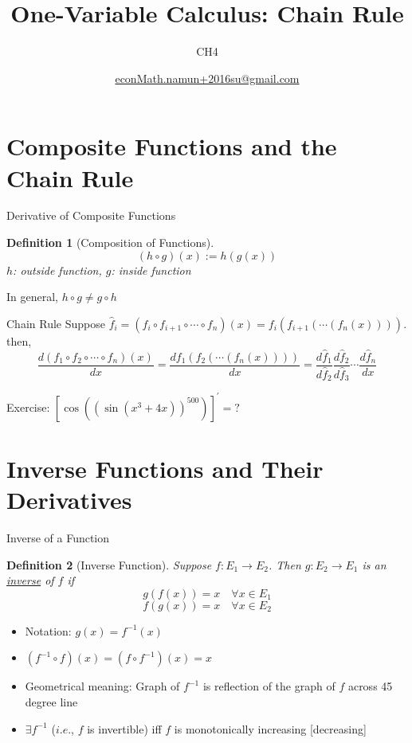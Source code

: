 \documentclass[a4paper,11pt]{article}
\author[조남운]{\url{econMath.namun+2016su@gmail.com}}
\title{One-Variable Calculus: Chain Rule}
\subtitle{CH4}
\newtheorem{defn}{Definition}
\begin{document}
	\maketitle


\section{Composite Functions and the Chain Rule} %
\label{sec:composite_functions_and_the_chain_rule}

\begin{frame}[t]{Derivative of Composite Functions}
	\begin{defn}
		[Composition of Functions]
		\[
			( h\circ g )(x) := h(g(x))
		\]
		$h$: outside function, $g$: inside function
	\end{defn}
	In general, $h\circ g \neq g \circ h$
	\begin{block}
		{Chain Rule}
		Suppose $\hat f_i = (f_i \circ f_{i+1} \circ \cdots \circ f_n)(x)=f_i(f_{i+1}(\cdots(f_n(x))))$. then,
		\[
			\frac{d( f_1 \circ f_2 \circ \cdots \circ f_n)(x)}{dx}=\frac{df_1(f_2(\cdots(f_n(x))))}{dx}= \frac{d\hat f_1}{d\hat f_2}\frac{d\hat f_2}{d\hat f_3}\cdots\frac{d\hat f_n}{dx}
		\]
	\end{block}
		Exercise: $[\cos((\sin(x^3+4x))^{500})]^\prime =?$
\end{frame}



\section{Inverse Functions and Their Derivatives} %
\label{sec:inverse_functions_and_their_derivatives}

\begin{frame}[t]{Inverse of a Function}
	\begin{defn}
		[Inverse Function]
		Suppose $f:E_1 \rightarrow E_2$. Then $g:E_2\rightarrow E_1$ is an \uline{inverse} of $f$ if\[
			g(f(x))=x\quad \forall x\in E_1
		\]\[
						f(g(x))=x\quad \forall x\in E_2
		\]
	\end{defn}
	\begin{itemize}
		\item Notation: $g(x)=f^{-1}(x)$
		\item $(f^{-1}\circ f) (x) = (f\circ f^{-1}) (x)=x$
		\item Geometrical meaning: Graph of $f^{-1}$ is reflection of the graph of $f$ across 45 degree line
		\item $\exists f^{-1}$ ($i.e.$, $f$ is invertible) iff $f$ is monotonically increasing [decreasing]
	\end{itemize}
\end{frame}
\end{document}
